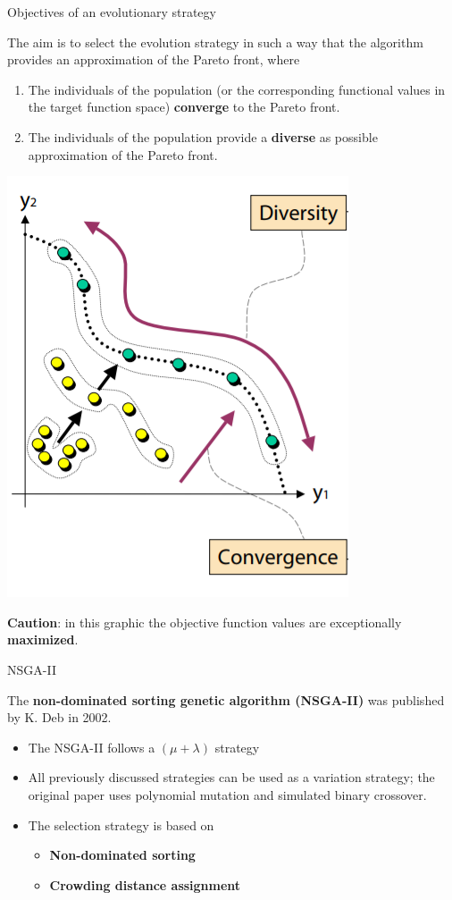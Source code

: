 \begin{frame}{Objectives of an evolutionary strategy}

The aim is to select the evolution strategy in such a way that the algorithm provides an approximation of the Pareto front, where

\begin{enumerate}
\item The individuals of the population (or the corresponding functional values in the target function space) \textbf{converge} to the Pareto front.
\item The individuals of the population provide a \textbf{diverse} as possible approximation of the Pareto front.
\end{enumerate}

\vspace*{-0.3cm}

\begin{center}
\includegraphics[width = 0.2\linewidth]{images/EMO_goals.png}
\end{center}

\vspace*{-0.5cm}

\begin{footnotesize}
\textbf{Caution}: in this graphic the objective function values are exceptionally \textbf{maximized}.
\end{footnotesize}

\end{frame}

\begin{frame}{NSGA-II}

The \textbf{non-dominated sorting genetic algorithm (NSGA-II)} was published by K. Deb in 2002.

\begin{itemize}
\item The NSGA-II follows a $(\mu + \lambda)$ strategy
\item All previously discussed strategies can be used as a variation strategy; the original paper uses polynomial mutation and simulated binary crossover.
\item The selection strategy is based on
\begin{itemize}
\item \textbf{Non-dominated sorting}
\item \textbf{Crowding distance assignment}
\end{itemize}
\end{itemize}

\end{frame}

